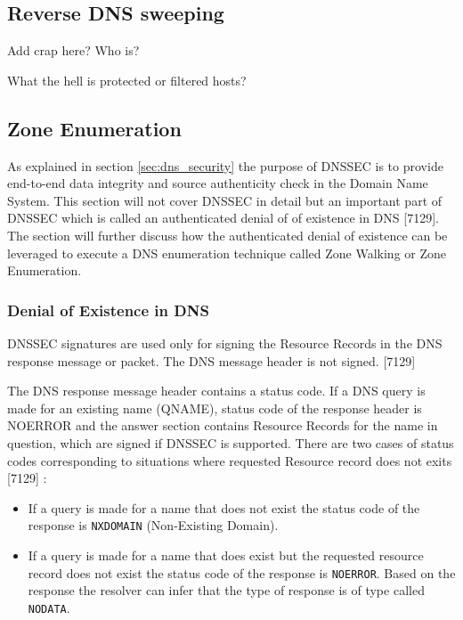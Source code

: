 \subsection{Reverse DNS sweeping}

Add crap here? Who is?

What the hell is protected or filtered hosts?

\subsection{Zone Enumeration}

As explained in section \ref{sec:dns_security} the purpose of DNSSEC is to provide end-to-end data integrity and source authenticity check in the Domain Name System. This section will not cover DNSSEC in detail but an important part of DNSSEC which is called an authenticated denial of 
of existence in DNS [7129]. The section will further discuss how the authenticated denial of existence can be leveraged to execute a DNS enumeration technique called Zone Walking or Zone Enumeration.

\subsubsection{Denial of Existence in DNS}

DNSSEC signatures are used only for signing the Resource Records in the DNS response message or packet. The DNS message header is not signed. [7129]  

The DNS response message header contains a status code. If a DNS query is made for an existing name (QNAME), status code of the response header is NOERROR and the answer section contains Resource Records for the name in question, which are signed if DNSSEC is supported. 
There are two cases of status codes corresponding to situations where requested Resource record does not exits [7129] :

\begin{itemize}
 \item If a query is made for a name that does not exist the status code of the response is \texttt{NXDOMAIN} (Non-Existing Domain).  
 \item If a query is made for a name that does exist but the requested resource record does not exist the status code of the response is \texttt{NOERROR}. Based on the response the resolver can infer that the type of response is of type called \texttt{NODATA}.
\end{itemize}

